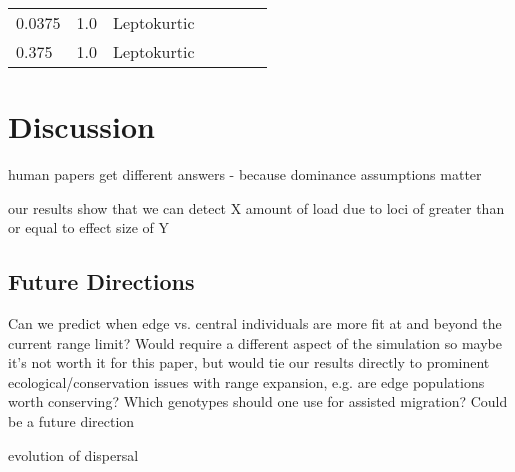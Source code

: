 \begin{table}[]
\begin{tabular}{p{}|p{}|p{}|p{}|p{}|p{}|p{}}
0.0375                     & 1.0                                   & Leptokurtic      &                      &                            &                                         &                                       \\
0.375                      & 1.0                                   & Leptokurtic      &                      &                            &                                         &                                       \\ \hline
\end{tabular}
\end{table}

\section{Discussion}


human papers get different answers - because dominance assumptions matter

our results show that we can detect X amount of load due to loci of greater than or equal to effect size of Y

\subsection{Future Directions}
Can we predict when edge vs. central individuals are more fit at and beyond the current range limit?  
Would require a different aspect of the simulation so maybe it’s not worth it for this paper, but would tie our results directly to prominent ecological/conservation issues with range expansion, e.g. are edge populations worth conserving? Which genotypes should one use for assisted migration? 
	Could be a future direction

evolution of dispersal



